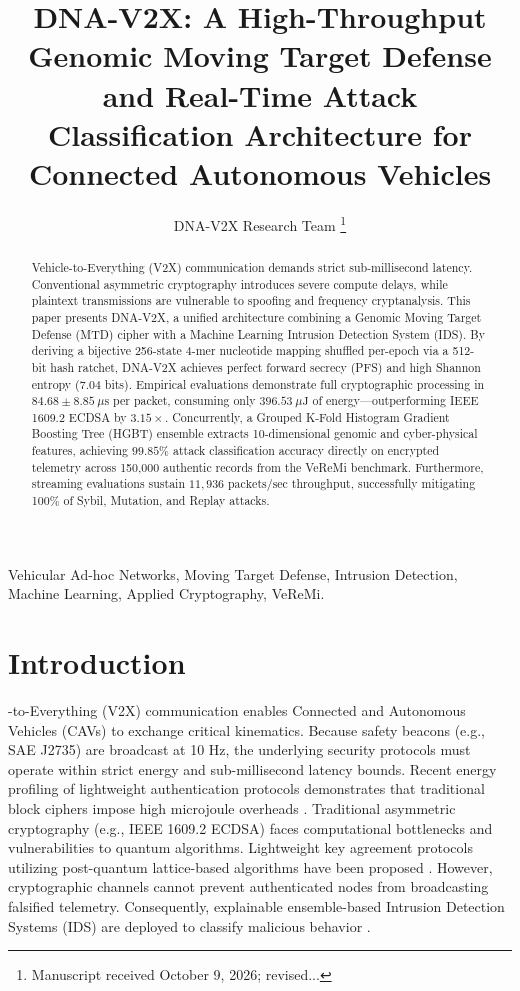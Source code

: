 \documentclass[journal]{IEEEtran}
\begin{document}
\title{DNA-V2X: A High-Throughput Genomic Moving Target Defense and Real-Time Attack Classification Architecture for Connected Autonomous Vehicles}

\author{DNA-V2X Research Team%
\thanks{Manuscript received October 9, 2026; revised...}}

\maketitle

\begin{abstract}
Vehicle-to-Everything (V2X) communication demands strict sub-millisecond latency. Conventional asymmetric cryptography introduces severe compute delays, while plaintext transmissions are vulnerable to spoofing and frequency cryptanalysis. This paper presents DNA-V2X, a unified architecture combining a Genomic Moving Target Defense (MTD) cipher with a Machine Learning Intrusion Detection System (IDS). By deriving a bijective 256-state 4-mer nucleotide mapping shuffled per-epoch via a 512-bit hash ratchet, DNA-V2X achieves perfect forward secrecy (PFS) and high Shannon entropy (7.04 bits). Empirical evaluations demonstrate full cryptographic processing in $84.68 \pm 8.85\ \mu\text{s}$ per packet, consuming only $396.53\ \mu\text{J}$ of energy---outperforming IEEE 1609.2 ECDSA by $3.15\times$. Concurrently, a Grouped K-Fold Histogram Gradient Boosting Tree (HGBT) ensemble extracts 10-dimensional genomic and cyber-physical features, achieving $99.85\%$ attack classification accuracy directly on encrypted telemetry across 150,000 authentic records from the VeReMi benchmark. Furthermore, streaming evaluations sustain $11,936\text{ packets/sec}$ throughput, successfully mitigating 100\% of Sybil, Mutation, and Replay attacks.
\end{abstract}

\begin{IEEEkeywords}
Vehicular Ad-hoc Networks, Moving Target Defense, Intrusion Detection, Machine Learning, Applied Cryptography, VeReMi.
\end{IEEEkeywords}

\section{Introduction}
-to-Everything (V2X) communication enables Connected and Autonomous Vehicles (CAVs) to exchange critical kinematics. Because safety beacons (e.g., SAE J2735) are broadcast at 10 Hz, the underlying security protocols must operate within strict energy and sub-millisecond latency bounds. Recent energy profiling of lightweight authentication protocols demonstrates that traditional block ciphers impose high microjoule overheads \cite{ref1}. Traditional asymmetric cryptography (e.g., IEEE 1609.2 ECDSA) faces computational bottlenecks and vulnerabilities to quantum algorithms. Lightweight key agreement protocols utilizing post-quantum lattice-based algorithms have been proposed \cite{ref2}. However, cryptographic channels cannot prevent authenticated nodes from broadcasting falsified telemetry. Consequently, explainable ensemble-based Intrusion Detection Systems (IDS) are deployed to classify malicious behavior \cite{ref3}.
\end{document}
